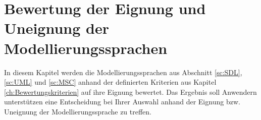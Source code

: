 

\chapter{Bewertung der Eignung und Uneignung der Modellierungssprachen}
\label{ch:Eignung}
In diesem Kapitel werden die Modellierungssprachen aus Abschnitt \ref{sc:SDL}, \ref{sc:UML} und \ref{sc:MSC} anhand der definierten Kriterien aus Kapitel \ref{ch:Bewertungskriterien} auf ihre Eignung bewertet. Das Ergebnis soll Anwendern unterstützen eine Entscheidung bei Ihrer Auswahl anhand der Eignung bzw. Uneignung der Modellierungssprache zu treffen.




\pagebreak




